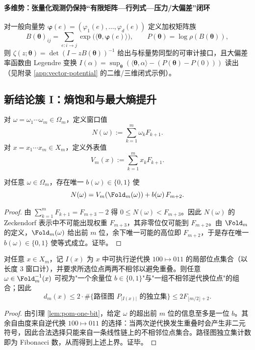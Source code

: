 \paragraph{多维势：张量化观测仍保持“有限矩阵—行列式—压力/大偏差”闭环}
对一般向量势
\(
\boldsymbol{\varphi}(e)=(\varphi_1(e),\dots,\varphi_d(e))
\)
定义加权矩阵族
\[
B(\boldsymbol{\theta})_{ij}=\sum_{e:i\to j}\exp\!\bigl(\langle\boldsymbol{\theta},\boldsymbol{\varphi}(e)\rangle\bigr),
\qquad
P(\boldsymbol{\theta})=\log\rho(B(\boldsymbol{\theta})),
\]
则
\(
\zeta(z;\boldsymbol{\theta})=\det(I-zB(\boldsymbol{\theta}))^{-1}
\)
给出与标量势同型的可审计接口，且大偏差率函数由 Legendre 变换
\(
I(\alpha)=\sup_{\boldsymbol{\theta}}(\langle\boldsymbol{\theta},\alpha\rangle-(P(\boldsymbol{\theta})-P(0)))
\)
读出（见附录 \ref{app:vector-potential} 的二维/三维闭式示例）。

\subsection{新结论簇 I：熵饱和与最大熵提升}\label{subsec:pom-entropy-maxent}
\begin{definition}[窗口值与外表值]\label{def:pom-window-value}
对 $\omega=\omega_1\cdots\omega_m\in\Omega_m$，定义窗口值
\[
N(\omega):=\sum_{k=1}^m \omega_k F_{k+1}.
\]
对 $x=x_1\cdots x_m\in X_m$，定义外表值
\[
V_m(x):=\sum_{k=1}^m x_k F_{k+1}.
\]
\end{definition}

\begin{lemma}[单隐藏位分解]\label{lem:pom-one-bit}
对任意 $\omega\in\Omega_m$，存在唯一 $b(\omega)\in\{0,1\}$ 使
\[
N(\omega)=V_m(\Fold_m(\omega)) + b(\omega)\,F_{m+2}.
\]
\end{lemma}
\begin{proof}
由 $\sum_{k=1}^m F_{k+1}=F_{m+3}-2$ 得 $0\le N(\omega)<F_{m+3}$。因此 $N(\omega)$ 的 Zeckendorf 表示中不可能出现权重 $F_{m+3}$，其非零位仅可能到 $F_{m+2}$。由 $\Fold_m$ 的定义，$\Fold_m(\omega)$ 给出前 $m$ 位，余下唯一可能的高位即 $F_{m+2}$，于是存在唯一 $b(\omega)\in\{0,1\}$ 使等式成立。证毕。
\end{proof}



\begin{proposition}[纤维自由度的二层分解]\label{prop:pom-fiber-decompose}
对任意 $x\in X_m$，记 $I(x)$ 为 $x$ 中可执行逆代换 $100\mapsto 011$ 的局部位点集合（以长度 $3$ 窗口计），并要求所选位点两两不相邻以避免重叠。则任意 $\omega\in\Fold_m^{-1}(x)$ 可视为"一个余量位 $b\in\{0,1\}$"与"一组不相邻逆代换位点"的组合；因此
\[
d_m(x)\le 2\cdot \#\{\text{路径图 }P_{|I(x)|}\text{ 的独立集}\}
\le 2F_{\lfloor m/2\rfloor+2}.
\]
\end{proposition}
\begin{proof}
由引理 \ref{lem:pom-one-bit}，给定 $\omega$ 的超出前 $m$ 位的信息至多是一位 $b$。其余自由度来自逆代换 $100\mapsto 011$ 的选择：当两次逆代换发生重叠时会产生非二元符号，因此合法选择只能来自一条线性链上的不相邻位点集合。路径图独立集计数即为 Fibonacci 数，从而得到上述上界。证毕。
\end{proof}

